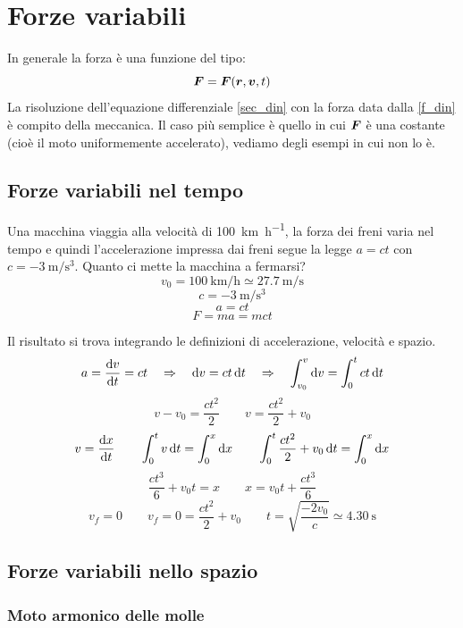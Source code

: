 \section{Forze variabili}
In generale la forza è una funzione del tipo:
\begin{equation}
  \boldsymbol{F}=\boldsymbol{F}(\boldsymbol{r},\boldsymbol{v},t)
  \label{f_din}
\end{equation}
La risoluzione dell'equazione differenziale \eqref{sec_din} con la forza data dalla \eqref{f_din} è compito della meccanica. Il caso più semplice è quello in cui $\boldsymbol{F}$ è una costante (cioè il moto uniformemente accelerato), vediamo degli esempi in cui non lo è.

\subsection{Forze variabili nel tempo}
\begin{Es}
  Una macchina viaggia alla velocità di \SI{100}{\kilo\meter\per\hour}, la forza dei freni
  varia nel tempo e quindi l'accelerazione impressa dai freni segue
  la legge $a=ct$ con $c=\SI{-3}{\meter\per\second^3}$. Quanto ci mette la
  macchina a fermarsi?
  \[ v_0=\SI{100}{\kilo\meter\per\hour} \simeq \SI{27.7}{\meter\per\second} \]
  \[ c=\SI{-3}{\meter\per\second^3} \]
  \[ a=ct \]
  \[ F=ma=mct \]

  Il risultato si trova integrando le definizioni di accelerazione, velocità e spazio.
  \[a=\frac{\mathrm{d} v}{\mathrm{d} t}=ct \quad \Rightarrow \quad\mathrm{d} v=ct\,\mathrm{d}
    t\quad\Rightarrow\quad\int_{v_0}^v\mathrm{d} v=\int_0^t ct\,\mathrm{d} t\]
  \[v-v_0=\frac{ct^2}{2}\qquad v=\frac{ct^2}{2}+v_0\]
  \[v=\frac{\mathrm{d} x}{\mathrm{d} t}\qquad\int_0^t v\,\mathrm{d} t=\int_0^x\mathrm{d}
    x\qquad\int_0^t\frac{ct^2}{2}+v_0\,\mathrm{d} t=\int_0^x\mathrm{d} x\]
  \[\frac{ct^3}{6}+v_0t=x\qquad x=v_0t+\frac{ct^3}{6}\]
  \[v_f=0\qquad v_f=0=\frac{ct^2}{2}+v_0\qquad
    t=\sqrt{\frac{-2v_0}{c}}\simeq \SI{4.30}{\second}\]
\end{Es}

\subsection{Forze variabili nello spazio}
\subsubsection{Moto armonico delle molle}
\label{armonico}

